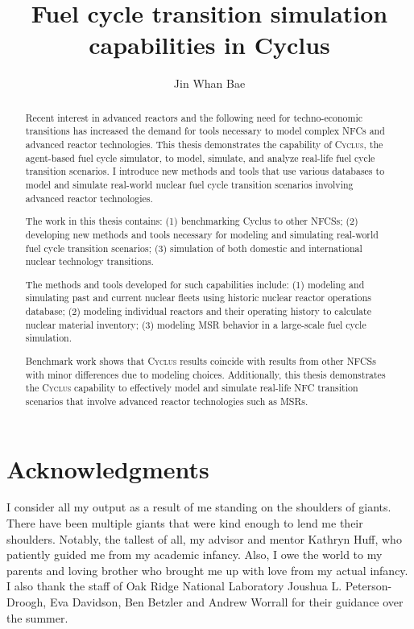 \documentclass[edeposit,fullpage]{uiucthesis2014}
\title{Fuel cycle transition simulation capabilities in Cyclus}
\author{Jin Whan Bae}
\newcommand{\Cyclus}{\textsc{Cyclus}\xspace}
\begin{document}
\maketitle

\frontmatter
\begin{abstract}

Recent interest in advanced reactors and the following need for techno-economic
transitions has increased the demand for tools necessary
to model complex \glspl{NFC} and advanced reactor technologies.
This thesis demonstrates the capability of \Cyclus, the
agent-based fuel cycle simulator, to model, simulate, and analyze
real-life fuel cycle transition scenarios. I introduce new methods
and tools that use various databases to model and simulate real-world
nuclear fuel cycle transition scenarios involving advanced reactor
technologies.

The work in this thesis contains:
(1) benchmarking
Cyclus to other \glspl{NFCS};
(2) developing new methods and tools necessary for modeling and simulating
real-world fuel cycle transition scenarios; (3)
simulation of both domestic and international nuclear technology
transitions.

The methods and tools developed for such capabilities include:
(1) modeling and simulating past and current
nuclear fleets using historic nuclear reactor operations
database; (2) modeling individual reactors and their operating history
to calculate nuclear material inventory; (3) modeling \gls{MSR} behavior
in a large-scale fuel cycle simulation.

Benchmark work shows that \Cyclus results coincide
with results from other \glspl{NFCS} with minor differences
due to modeling choices.
Additionally, this thesis demonstrates the \Cyclus capability to effectively
model and simulate real-life \gls{NFC} transition scenarios
that involve advanced reactor technologies such as \glspl{MSR}.

\end{abstract}

\chapter*{Acknowledgments}


I consider all my output as a result of me standing on the shoulders
of giants. There have been multiple giants that were kind enough
to lend me their shoulders. Notably, the tallest of all, my advisor
and mentor Kathryn Huff, who patiently guided me from my academic
infancy. Also, I owe the world to my parents and loving brother who
brought me up with love
from my actual infancy.  I also thank the staff of Oak Ridge National Laboratory
Joushua L. Peterson-Droogh, Eva Davidson, Ben Betzler and Andrew Worrall for their
guidance over the summer.
\end{document}
